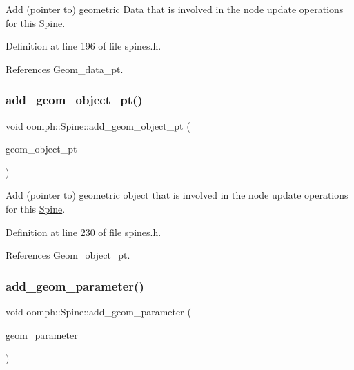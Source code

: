 Add (pointer to) geometric \hyperlink{classoomph_1_1Data}{Data} that is involved in the node update operations for this \hyperlink{classoomph_1_1Spine}{Spine}. 



Definition at line 196 of file spines.\+h.



References Geom\+\_\+data\+\_\+pt.

\mbox{\label{classoomph_1_1Spine_adf9717dda0fb1b5fd99e50e4737d9706}} 
\subsubsection{\texorpdfstring{add\+\_\+geom\+\_\+object\+\_\+pt()}{add\_geom\_object\_pt()}}
{\footnotesize\ttfamily void oomph\+::\+Spine\+::add\+\_\+geom\+\_\+object\+\_\+pt (\begin{DoxyParamCaption}\item[{\hyperlink{classoomph_1_1GeomObject}{Geom\+Object} $\ast$}]{geom\+\_\+object\+\_\+pt }\end{DoxyParamCaption})\hspace{0.3cm}{\ttfamily [inline]}}



Add (pointer to) geometric object that is involved in the node update operations for this \hyperlink{classoomph_1_1Spine}{Spine}. 



Definition at line 230 of file spines.\+h.



References Geom\+\_\+object\+\_\+pt.

\mbox{\label{classoomph_1_1Spine_a67e2aa787f36792224dc48d2101d6091}} 
\subsubsection{\texorpdfstring{add\+\_\+geom\+\_\+parameter()}{add\_geom\_parameter()}}
{\footnotesize\ttfamily void oomph\+::\+Spine\+::add\+\_\+geom\+\_\+parameter (\begin{DoxyParamCaption}\item[{const double \&}]{geom\+\_\+parameter }\end{DoxyParamCaption})\hspace{0.3cm}{\ttfamily [inline]}}



